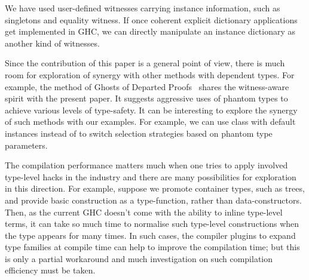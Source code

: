 \documentclass[demotion-paper.tex]{subfiles}
\begin{document}
We have used user-defined witnesses carrying instance information, such as singletons and equality witness.
If once coherent explicit dictionary applications~\cite{Winant:2018wu} get implemented in GHC, we can directly manipulate an instance dictionary as another kind of witnesses.

Since the contribution of this paper is a general point of view, there is much room for exploration of synergy with other methods with dependent types.
For example, the method of Ghosts of Departed Proofs~\cite{Noonan:2018aa} shares the witness-aware spirit with the present paper.
It suggests aggressive uses of phantom types to achieve various levels of type-safety.
It can be interesting to explore the synergy of such methods with our examples.
For example, we can use  class with default instances instead of  to switch selection strategies based on phantom type parameters.

The compilation performance matters much when one tries to apply involved type-level hacks in the industry and there are many possibilities for exploration in this direction.
For example, suppose we promote container types, such as trees, and provide basic construction as a type-function, rather than data-constructors.
Then, as the current GHC doesn't come with the ability to inline type-level terms, it can take so much time to normalise such type-level constructions when the type appears for many times.
In such cases, the compiler plugins to expand type families at compile time can help to improve the compilation time; but this is only a partial workaround and much investigation on such compilation efficiency must be taken.
\end{document}

